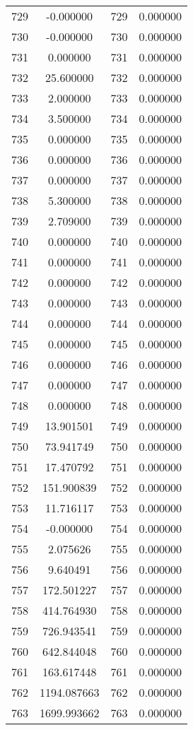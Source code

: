 \documentclass[12pt]{article}
\begin{document}
\begin{longtable}{@{}cccc@{}}
729 & -0.000000 & 729 & 0.000000 \\
730 & -0.000000 & 730 & 0.000000 \\
731 & 0.000000 & 731 & 0.000000 \\
732 & 25.600000 & 732 & 0.000000 \\
733 & 2.000000 & 733 & 0.000000 \\
734 & 3.500000 & 734 & 0.000000 \\
735 & 0.000000 & 735 & 0.000000 \\
736 & 0.000000 & 736 & 0.000000 \\
737 & 0.000000 & 737 & 0.000000 \\
738 & 5.300000 & 738 & 0.000000 \\
739 & 2.709000 & 739 & 0.000000 \\
740 & 0.000000 & 740 & 0.000000 \\
741 & 0.000000 & 741 & 0.000000 \\
742 & 0.000000 & 742 & 0.000000 \\
743 & 0.000000 & 743 & 0.000000 \\
744 & 0.000000 & 744 & 0.000000 \\
745 & 0.000000 & 745 & 0.000000 \\
746 & 0.000000 & 746 & 0.000000 \\
747 & 0.000000 & 747 & 0.000000 \\
748 & 0.000000 & 748 & 0.000000 \\
749 & 13.901501 & 749 & 0.000000 \\
750 & 73.941749 & 750 & 0.000000 \\
751 & 17.470792 & 751 & 0.000000 \\
752 & 151.900839 & 752 & 0.000000 \\
753 & 11.716117 & 753 & 0.000000 \\
754 & -0.000000 & 754 & 0.000000 \\
755 & 2.075626 & 755 & 0.000000 \\
756 & 9.640491 & 756 & 0.000000 \\
757 & 172.501227 & 757 & 0.000000 \\
758 & 414.764930 & 758 & 0.000000 \\
759 & 726.943541 & 759 & 0.000000 \\
760 & 642.844048 & 760 & 0.000000 \\
761 & 163.617448 & 761 & 0.000000 \\
762 & 1194.087663 & 762 & 0.000000 \\
763 & 1699.993662 & 763 & 0.000000 \\

\end{longtable}
\end{document}
